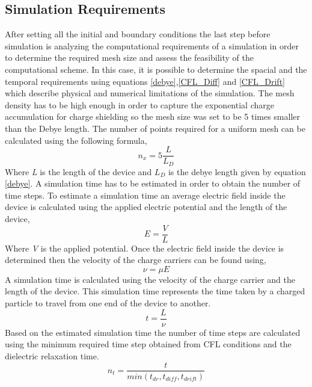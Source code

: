 \begin{doublespace}
\clearpage
\section{Simulation Requirements}
After setting all the initial and boundary conditions the last step before simulation is analyzing the computational requirements of a simulation in order to determine the required mesh size and assess the feasibility of the computational scheme. In this case, it is possible to determine the spacial and the temporal requirements using  equations \ref{debye},\ref{CFL_Diff} and \ref{CFL_Drift} which describe physical and numerical limitations of the simulation. The mesh density has to be high enough in order to capture the exponential charge accumulation for charge shielding so the mesh size was set to be 5 times smaller than the Debye length. The number of points required for a uniform mesh can be calculated using the following formula,
\begin{equation}
n_x = 5\frac{L}{L_{D}}
\end{equation} 
Where \textit{L} is the length of the device and $L_{D}$ is the debye length given by equation \ref{debye}. A simulation time has to be estimated in order to obtain the number of time steps. To estimate a simulation time an average electric field inside the device is calculated using the applied electric potential and the length of the device,
\begin{equation}
E = \frac{V}{L}
\end{equation} 
Where \textit{V} is the applied potential. Once the electric field inside the device is determined then the velocity of the charge carriers can be found using,
\begin{equation}
\nu = \mu E
\end{equation} 
A simulation time is calculated using the velocity of the charge carrier and the length of the device. This simulation time represents the time taken by a charged particle to travel from one end of the device to another.  
\begin{equation}
t = \frac{L}{\nu} 
\end{equation} 
Based on the estimated simulation time the number of time steps are calculated using the minimum required time step obtained from CFL conditions and the dielectric relaxation time.
\begin{equation}
n_{t} = \frac{t}{min(t_{dr},t_{diff},t_{drift})} 
\end{equation} 
 \begin{table}

\end{table}
\end{doublespace}
